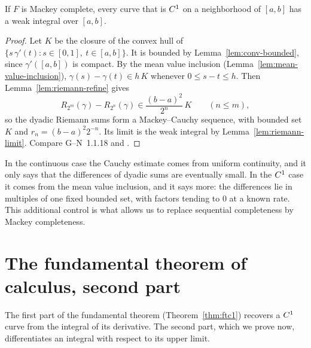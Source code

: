 \begin{theorem}
  \label{thm:exists-mackey}
  \leanok
  If $F$ is Mackey complete, every curve that is $C^{1}$ on a neighborhood of $[a, b]$ has a weak
  integral over $[a, b]$.
\end{theorem}

\begin{proof}
  \leanok
  Let $K$ be the closure of the convex hull of $\{s\,\gamma'(t) : s \in [0, 1],\ t \in [a, b]\}$.
  It is bounded by Lemma~\ref{lem:conv-bounded}, since $\gamma'([a, b])$ is compact. By the mean
  value inclusion (Lemma~\ref{lem:mean-value-inclusion}), $\gamma(s) - \gamma(t) \in h\, K$
  whenever $0 \leq s - t \leq h$. Then Lemma~\ref{lem:riemann-refine} gives
  \[
    R_{2^m}(\gamma) - R_{2^n}(\gamma) \in \frac{(b - a)^2}{2^n}\, K \qquad (n \leq m),
  \]
  so the dyadic Riemann sums form a Mackey--Cauchy sequence, with bounded set $K$ and
  $r_n = (b - a)^2 2^{-n}$. Its limit is the weak integral by Lemma~\ref{lem:riemann-limit}.
  Compare G--N~1.1.18 and \cite[2.14]{KM97}.
\end{proof}

\begin{remark}
  In the continuous case the Cauchy estimate comes from uniform continuity, and it only says
  that the differences of dyadic sums are eventually small. In the $C^{1}$ case it comes from
  the mean value inclusion, and it says more: the differences lie in multiples of one fixed
  bounded set, with factors tending to $0$ at a known rate. This additional control is what
  allows us to replace sequential completeness by Mackey completeness.
\end{remark}

\section{The fundamental theorem of calculus, second part}
\label{sec:ftc2}

The first part of the fundamental theorem (Theorem~\ref{thm:ftc1}) recovers a $C^{1}$ curve
from the integral of its derivative. The second part, which we prove now, differentiates an
integral with respect to its upper limit.

